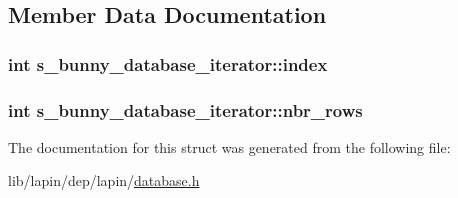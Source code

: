 \subsection{Member Data Documentation}
\hypertarget{structs__bunny__database__iterator_a2765db1909f0fbeb97883fe0c25bacf3}{
\subsubsection[{index}]{ {\bf int} s\-\_\-bunny\-\_\-database\-\_\-iterator\-::index}}\label{structs__bunny__database__iterator_a2765db1909f0fbeb97883fe0c25bacf3}
\hypertarget{structs__bunny__database__iterator_adc0be4358231e7de8744ba59ee171de3}{
\subsubsection[{nbr\-\_\-rows}]{ {\bf int} s\-\_\-bunny\-\_\-database\-\_\-iterator\-::nbr\-\_\-rows}}\label{structs__bunny__database__iterator_adc0be4358231e7de8744ba59ee171de3}


The documentation for this struct was generated from the following file\-:\begin{DoxyCompactItemize}
\item 
lib/lapin/dep/lapin/\hyperlink{database_8h}{database.\-h}\end{DoxyCompactItemize}

